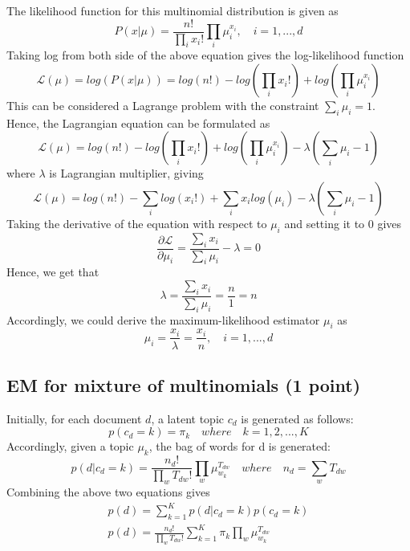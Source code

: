 \documentclass[12pt,a4paper]{article}
\begin{document}
	\noindent The likelihood function for this multinomial distribution is given as
	\begin{equation}
		P(x|\mu) = \frac{n!}{\prod_{i}x_i!}\prod_{i}\mu^{x_i}_i,\quad i=1, ..., d
	\end{equation}
	Taking log from both side of the above equation gives the log-likelihood function
	\begin{equation}
		\mathcal{L}(\mu) = log(P(x|\mu)) = log(n!)- log(\prod_{i}x_i!) +log(\prod_{i}\mu^{x_i}_i)
	\end{equation}
	This can be considered a Lagrange problem with the constraint $\sum_{i}\mu_i=1$. Hence, the Lagrangian equation can be formulated as
	\begin{equation}
		\mathcal{L}(\mu) = log(n!)- log(\prod_{i}x_i!) +log(\prod_{i}\mu^{x_i}_i) - \lambda(\sum_{i}\mu_i-1)
	\end{equation}
where $\lambda$ is Lagrangian multiplier, giving
\begin{equation}
	\mathcal{L}(\mu) = log(n!)- \sum_{i}log(x_i!) + \sum_{i}{x_i}log(\mu_i) - \lambda(\sum_{i}\mu_i-1)
\end{equation}
	Taking the derivative of the equation with respect to $\mu_i$ and setting it to 0 gives
	\begin{equation}
		\frac{\partial \mathcal{L}}{\partial \mu_i}= \frac{\sum_{i}x_i}{\sum_{i}\mu_i} - \lambda = 0
	\end{equation}
	Hence, we get that
	\begin{equation}
		 \lambda= \frac{\sum_{i}x_i}{\sum_{i}\mu_i} = \frac{n}{1} = n
	\end{equation}
	Accordingly, we could derive the maximum-likelihood estimator $\mu_i$ as
	\begin{equation}
		\mu_i= \frac{x_i}{\lambda} = \frac{x_i}{n},\quad i=1, ..., d
	\end{equation}


	\subsection{EM for mixture of multinomials (1 point)}
	Initially, for each document $d$, a latent topic $c_d$ is generated as follows:
	\begin{equation}
		p(c_d=k) = \pi_k\quad where \quad k = 1,2,...,K
	\end{equation}
	Accordingly, given a topic $\mu_k$, the bag of words for d is generated:
	\begin{equation}
		p(d|c_d=k) = \frac{n_d!}{\prod_{w}T_{dw}!}\prod_{w}\mu_{w_k}^{T_{dw}}\quad where \quad n_d = \sum_{w} T_{dw}
	\end{equation}
	Combining the above two equations gives
	\begin{align*}
		p(d) = \sum_{k=1}^{K}p(d|c_d=k)p(c_d=k) \\
		p(d) =  \frac{n_d!}{\prod_{w}T_{dw}!}\sum_{k=1}^{K}\pi_k\prod_{w}\mu_{w_k}^{T_{dw}}
	\end{align*}
	
\end{document}
